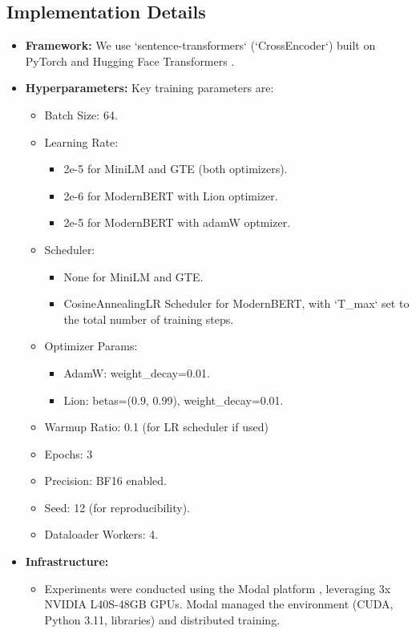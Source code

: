 \documentclass[conference]{IEEEtran}
\begin{document}
\subsection{Implementation Details}
\begin{itemize}
    \item \textbf{Framework:} We use `sentence-transformers` \cite{reimers2019sentence} (`CrossEncoder`) built on PyTorch \cite{paszke2019pytorchimperativestylehighperformance} and Hugging Face Transformers \cite{wolf2020transformers}.
    \item \textbf{Hyperparameters:} Key training parameters are:
        \begin{itemize}
            \item Batch Size: 64.
            \item Learning Rate:
                \begin{itemize}
                    \item 2e-5 for MiniLM and GTE (both optimizers).
                    \item 2e-6 for ModernBERT with Lion optimizer.
                    \item 2e-5 for ModernBERT with adamW optmizer.
                \end{itemize}
            \item Scheduler:
                \begin{itemize}
                    \item None for MiniLM and GTE.
                    \item CosineAnnealingLR Scheduler for ModernBERT, with `T\_max` set to the total number of training steps.
                \end{itemize}
            \item Optimizer Params:
                \begin{itemize}
                    \item AdamW: weight\_decay=0.01.
                    \item Lion: betas=(0.9, 0.99), weight\_decay=0.01.
                \end{itemize}
            \item Warmup Ratio: 0.1 (for LR scheduler if used)
            \item Epochs: 3
            \item Precision: BF16 enabled.
            \item Seed: 12 (for reproducibility).
            \item Dataloader Workers: 4.
        \end{itemize}
    \item \textbf{Infrastructure:} 
    \begin{itemize}
        \item Experiments were conducted using the Modal platform \cite{modal_labs}, leveraging 3x NVIDIA L40S-48GB GPUs. Modal managed the environment (CUDA, Python 3.11, libraries) and distributed training.


\end{itemize}
\end{itemize}
\end{document}
